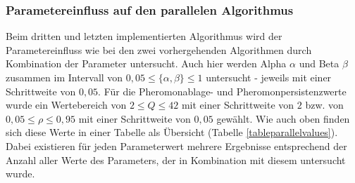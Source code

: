 \documentclass[doktyp=barbeit, sprache=german]{TUBAFarbeiten}
\begin{document}
\subsubsection{Parametereinfluss auf den parallelen Algorithmus}
Beim dritten und letzten implementierten Algorithmus wird der Parametereinfluss wie bei den zwei vorhergehenden Algorithmen durch Kombination der Parameter untersucht. Auch hier werden Alpha $\alpha$ und Beta $\beta$ zusammen im Intervall von $0,05 \leq \{\alpha,\beta\} \leq 1$ untersucht - jeweils mit einer Schrittweite von $0,05$. Für die Pheromonablage- und Pheromonpersistenzwerte wurde ein Wertebereich von $2 \leq Q \leq 42$ mit einer Schrittweite von $2$ bzw. von $0,05 \leq \rho \leq 0,95$ mit einer Schrittweite von $0,05$ gewählt.
Wie auch oben finden sich diese Werte in einer Tabelle als Übersicht (Tabelle \ref{tableparallelvalues}). Dabei existieren für jeden Parameterwert mehrere Ergebnisse entsprechend der Anzahl aller Werte des Parameters, der in Kombination mit diesem untersucht wurde. 
\begin{table}[]
\centering
{}
\caption[Übersicht über die Parameterwerte für die Untersuchung der Abhängigkeit der Tourlänge von den einzelnen Parametenr bei Betrachtung des parallelen Algorithmus zur Tourkonstruktion]{Übersicht über die Parameterwerte für die Untersuchung der Abhängigkeit der Tourlänge von den einzelnen Parametern bei Betrachtung des parallelen Algorithmus zur Tourkonstruktion. Die Spalte \glqq Parameterwert bei Untersuchung der anderen Parameter\grqq\, gibt an, welche Werte für Alpha $\alpha$ und Beta $\beta$ bei Untersuchung der Pheromonablagemenge und der Pheromonpersistenz gewählt wurden und umgekehrt.}
\label{tableparallelvalues}
\end{table}
\end{document}
